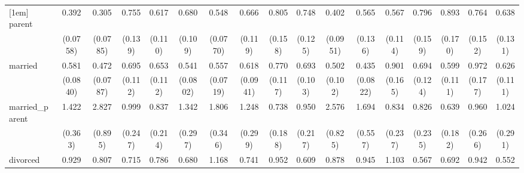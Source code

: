 {\begin{tabular}{l*{16}{c}}
[1em]
parent              &       0.392\sym{***}&       0.305\sym{***}&       0.755         &       0.617\sym{**} &       0.680\sym{*}  &       0.548\sym{***}&       0.666\sym{*}  &       0.805         &       0.748         &       0.402\sym{***}&       0.565\sym{*}  &       0.567\sym{**} &       0.796         &       0.893         &       0.764         &       0.638\sym{*}  \\
                    &    (0.0758)         &    (0.0785)         &     (0.139)         &     (0.110)         &     (0.109)         &    (0.0770)         &     (0.119)         &     (0.158)         &     (0.125)         &    (0.0951)         &     (0.136)         &     (0.114)         &     (0.159)         &     (0.170)         &     (0.152)         &     (0.131)         \\
[1em]
married             &       0.581\sym{***}&       0.472\sym{***}&       0.695\sym{*}  &       0.653\sym{*}  &       0.541\sym{***}&       0.557\sym{***}&       0.618\sym{**} &       0.770         &       0.693\sym{*}  &       0.502\sym{***}&       0.435\sym{***}&       0.901         &       0.694\sym{*}  &       0.599\sym{**} &       0.972         &       0.626\sym{**} \\
                    &    (0.0840)         &    (0.0787)         &     (0.112)         &     (0.112)         &    (0.0802)         &    (0.0719)         &    (0.0941)         &     (0.117)         &     (0.103)         &     (0.102)         &    (0.0822)         &     (0.165)         &     (0.124)         &     (0.111)         &     (0.177)         &     (0.111)         \\
[1em]
married\_parent      &       1.422         &       2.827\sym{**} &       0.999         &       0.837         &       1.342         &       1.806\sym{**} &       1.248         &       0.738         &       0.950         &       2.576\sym{**} &       1.694         &       0.834         &       0.826         &       0.639         &       0.960         &       1.024         \\
                    &     (0.363)         &     (0.895)         &     (0.247)         &     (0.214)         &     (0.297)         &     (0.346)         &     (0.299)         &     (0.188)         &     (0.217)         &     (0.825)         &     (0.557)         &     (0.237)         &     (0.235)         &     (0.182)         &     (0.266)         &     (0.291)         \\
[1em]
divorced            &       0.929         &       0.807         &       0.715         &       0.786         &       0.680\sym{*}  &       1.168         &       0.741         &       0.952         &       0.609\sym{*}  &       0.878         &       0.945         &       1.103         &       0.567\sym{*}  &       0.692         &       0.942         &       0.552\sym{*}  \\

\end{tabular}}
